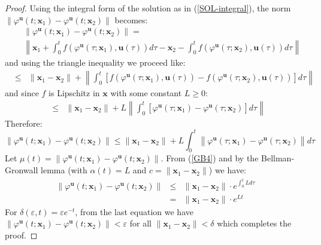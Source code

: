 \documentclass[a4paper,10pt,oneside]{book}
\begin{document}
\begin{proof}
 Using the integral form of the solution as in (\ref{SOL-integral}), the norm $\|\varphi^{\mathbf{u}}(t;\mathbf{x}_1)-\varphi^{\mathbf{u}}(t;\mathbf{x}_2) \|$ becomes:
\begin{eqnarray*}
 &&\|\varphi^{\mathbf{u}}(t;\mathbf{x}_1)-\varphi^{\mathbf{u}}(t;\mathbf{x}_2) \| = \\
  && \left\| \mathbf{x}_1+\int_{0}^{t}f(\varphi^{\mathbf{u}}(\tau;\mathbf{x}_1),\mathbf{u}(\tau))d\tau-\mathbf{x}_2-\int_{0}^{t}f(\varphi^{\mathbf{u}}(\tau;\mathbf{x}_2),\mathbf{u}(\tau))d\tau \right\|
\end{eqnarray*}
and using the triangle inequality we proceed like:
\begin{eqnarray*}  
  &\leq& \|\mathbf{x}_1-\mathbf{x}_2 \| + \left\| \int_{0}^{t}\left[ f(\varphi^{\mathbf{u}}(\tau;\mathbf{x}_1),\mathbf{u}(\tau))-f(\varphi^{\mathbf{u}}(\tau;\mathbf{x}_2),\mathbf{u}(\tau)) \right] d\tau \right\|
\end{eqnarray*}
and since $f$ is Lipschitz in $\mathbf{x}$ with some constant $L\geq 0$:
\begin{eqnarray*}  
  &\leq& \|\mathbf{x}_1-\mathbf{x}_2 \| + L \left\| \int_{0}^{t}\left[ \varphi^{\mathbf{u}}(\tau;\mathbf{x}_1)-\varphi^{\mathbf{u}}(\tau;\mathbf{x}_2) \right] d\tau \right\| 
\end{eqnarray*}
Therefore:
\begin{equation}
   \|\varphi^{\mathbf{u}}(t;\mathbf{x}_1)-\varphi^{\mathbf{u}}(t;\mathbf{x}_2) \| \leq \|\mathbf{x}_1-\mathbf{x}_2 \| + L  \int_{0}^{t}\left\| \varphi^{\mathbf{u}}(\tau;\mathbf{x}_1)-\varphi^{\mathbf{u}}(\tau;\mathbf{x}_2) \right\| d\tau \label{GB4}
\end{equation}
Let $\mu(t)=\|\varphi^{\mathbf{u}}(t;\mathbf{x}_1)-\varphi^{\mathbf{u}}(t;\mathbf{x}_2) \|$. From (\ref{GB4}) and by the Bellman-Gronwall lemma (with $\alpha(t)=L$ and $c=\|\mathbf{x}_1-\mathbf{x}_2 \|$) we have:
\begin{eqnarray}
 \|\varphi^{\mathbf{u}}(t;\mathbf{x}_1)-\varphi^{\mathbf{u}}(t;\mathbf{x}_2) \| &\leq& \|\mathbf{x}_1-\mathbf{x}_2 \|\cdot e^{\int_0^t Ld\tau}\\
&=&\|\mathbf{x}_1-\mathbf{x}_2 \|\cdot e^{Lt}\label{KclassUpperBound}
\end{eqnarray}
For $\delta(\varepsilon,t)=\varepsilon e^{-t}$, from the last equation we have $\|\varphi^{\mathbf{u}}(t;\mathbf{x}_1)-\varphi^{\mathbf{u}}(t;\mathbf{x}_2) \|<\varepsilon$ for all $\|\mathbf{x}_1-\mathbf{x}_2 \|<\delta$ which completes the proof.
\end{proof}
\end{document}
